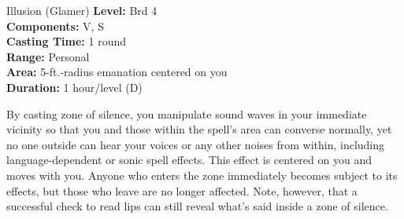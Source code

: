 {Illusion (Glamer)}
{
	\textbf{Level:}
	Brd 4\\
	\textbf{Components:}
	V, S\\
	\textbf{Casting Time:}
	1 round\\
	\textbf{Range:}
	Personal\\
	\textbf{Area:}
	5-ft.-radius emanation centered on you\\
	\textbf{Duration:}
	1 hour/level (D)\\
}
{
	By casting zone of silence, you manipulate sound waves in your immediate vicinity so that you and those within the spell's area can converse normally, yet no one outside can hear your voices or any other noises from within, including language-dependent or sonic spell effects. This effect is centered on you and moves with you. Anyone who enters the zone immediately becomes subject to its effects, but those who leave are no longer affected. Note, however, that a successful  check to read lips can still reveal what's said inside a zone of silence.

}
